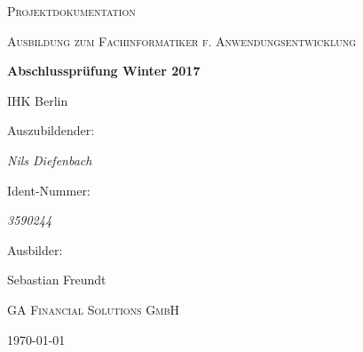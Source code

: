 \documentclass[fontsize=11pt,paper=a4,draft=off,titlepage=off, oneside]{scrartcl}
\begin{document}
\pagestyle{fancy}


\begin{titlepage}
    \centering
    {\scshape\LARGE Projektdokumentation\par}
    \vspace{1cm}
    {\scshape\Large Ausbildung zum Fachinformatiker f. Anwendungsentwicklung\par}
    \vspace{1.5cm}
    {\huge\bfseries Abschlussprüfung Winter 2017\par IHK Berlin\par}
    \vspace{2cm}
    Auszubildender:\par
    {\Large\itshape Nils Diefenbach\par}
    Ident-Nummer:\par
    {\Large\itshape 3590244\par}
    \vfill
    Ausbilder:\par
    Sebastian Freundt\par \textsc{GA Financial Solutions GmbH}
    \vfill
    {\large \today\par}
\end{titlepage}
\clearpage

\tableofcontents{}
\clearpage

\thispagestyle{empty}
\listoffigures
\listoftables
\newpage
{}

\label{section:abbreviations}

\clearpage

\label{section:einleitung}

\clearpage

























{}

\end{document}
